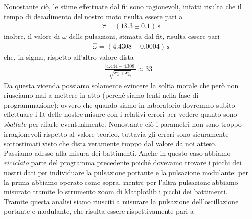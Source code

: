 \documentclass{article}
\begin{document}
Nonostante ciò, le stime effettuate dal fit sono ragionevoli, infatti risulta che il tempo di decadimento del nostro moto risulta essere pari a
\begin{align}
	&\hat{\tau} = (18.3 \pm 0.1) \, \si{\second}
\end{align}
inoltre, il valore di $\omega$ delle pulsazioni, stimata dal fit, risulta essere pari
\begin{align}
	&\hat{\omega} = (4.4308 \pm 0.0004) \, \si{\second}
\end{align}
che, in sigma, rispetto all'altro valore dista
\begin{align}
	\frac{|4.444 - 4.308|}{\sqrt{\sigma^2_{\omega}+ \sigma^2_{\omega_c}}} \approx 33
\end{align}
Da questa vicenda possiamo solamente evincere la solita morale che però non riusciamo mai a mettere in atto (perché siamo lenti nella fase di programmazione): ovvero che quando siamo in laboratorio dovremmo subito effettuare i fit delle nostre misure con i relativi errori per vedere quanto sono \emph{sballate} per rifarle eventualmente. Nonostante ciò i parametri non sono troppo irragionevoli rispetto al valore teorico, tuttavia gli errori sono sicuramente sottostimati visto che dista veramente troppo dal valore da noi atteso. \\
Passiamo adesso alla misura dei battimenti. Anche in questo caso abbiamo \emph{riciclato} parte del programma precedente poiché dovevamo trovare i picchi dei nostri dati per individuare la pulsazione portante e la pulsazione modulante: per la prima abbiamo operato come sopra, mentre per l'altra pulsazione abbiamo misurato tramite lo strumento zoom di Matplotlib i picchi dei battimenti.
Tramite questa analisi siamo riusciti a misurare la pulsazione dell'oscillazione portante e modulante, che risulta essere rispettivamente pari a
\end{document}
